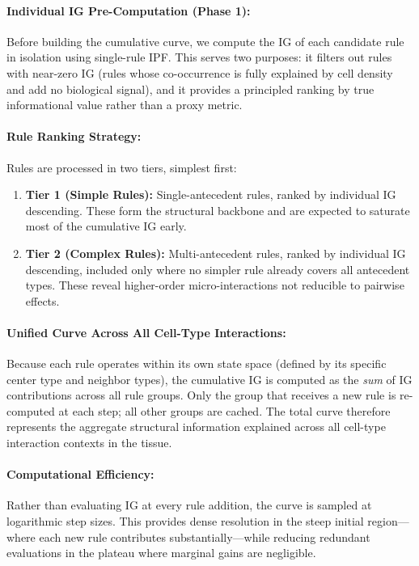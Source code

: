 \documentclass[10pt, a4paper]{article}
\begin{document}
\paragraph{Individual IG Pre-Computation (Phase 1):} Before building the cumulative curve, we compute the IG of each candidate rule in isolation using single-rule IPF. This serves two purposes: it filters out rules with near-zero IG (rules whose co-occurrence is fully explained by cell density and add no biological signal), and it provides a principled ranking by true informational value rather than a proxy metric.

\paragraph{Rule Ranking Strategy:} Rules are processed in two tiers, simplest first:
\begin{enumerate}
    \item \textbf{Tier 1 (Simple Rules):} Single-antecedent rules, ranked by individual IG descending. These form the structural backbone and are expected to saturate most of the cumulative IG early.
    \item \textbf{Tier 2 (Complex Rules):} Multi-antecedent rules, ranked by individual IG descending, included only where no simpler rule already covers all antecedent types. These reveal higher-order micro-interactions not reducible to pairwise effects.
\end{enumerate}

\paragraph{Unified Curve Across All Cell-Type Interactions:} Because each rule operates within its own state space (defined by its specific center type and neighbor types), the cumulative IG is computed as the \textit{sum} of IG contributions across all rule groups. Only the group that receives a new rule is re-computed at each step; all other groups are cached. The total curve therefore represents the aggregate structural information explained across all cell-type interaction contexts in the tissue.

\paragraph{Computational Efficiency:} Rather than evaluating IG at every rule addition, the curve is sampled at logarithmic step sizes. This provides dense resolution in the steep initial region—where each new rule contributes substantially—while reducing redundant evaluations in the plateau where marginal gains are negligible.
\end{document}
